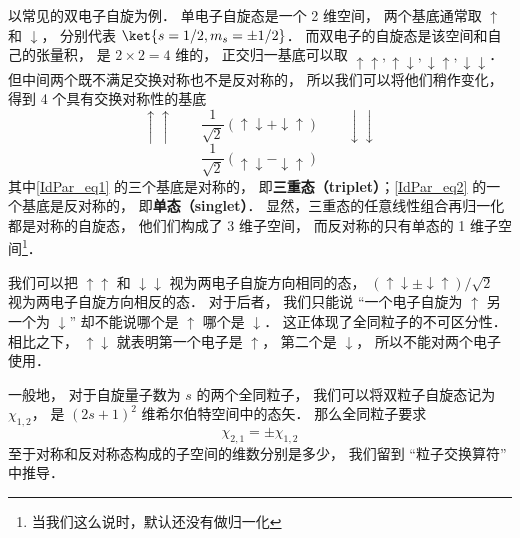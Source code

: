 \begin{example}{}
以常见的双电子自旋为例． 单电子自旋态是一个 2 维空间， 两个基底通常取 $\uparrow$ 和 $\downarrow$， 分别代表 $\ket{s=1/2,m_s=\pm 1/2}$． 而双电子的自旋态是该空间和自己的张量积， 是 $2\times2 = 4$ 维的， 正交归一基底可以取 $\uparrow\uparrow, \uparrow\downarrow, \downarrow\uparrow, \downarrow\downarrow$． 但中间两个既不满足交换对称也不是反对称的， 所以我们可以将他们稍作变化， 得到 4 个具有交换对称性的基底
\begin{equation}\label{IdPar_eq1}
\uparrow\uparrow \qquad \frac{1}{\sqrt 2}(\uparrow\downarrow + \downarrow\uparrow) \qquad \downarrow\downarrow
\end{equation}
\begin{equation}\label{IdPar_eq2}
\frac{1}{\sqrt 2}(\uparrow\downarrow - \downarrow\uparrow)
\end{equation}
其中\autoref{IdPar_eq1} 的三个基底是对称的， 即\textbf{三重态（triplet）}；\autoref{IdPar_eq2} 的一个基底是反对称的， 即\textbf{单态（singlet）}． %
显然，三重态的任意线性组合再归一化都是对称的自旋态， 他们们构成了 3 维子空间， 而反对称的只有单态的 1 维子空间\footnote{当我们这么说时，默认还没有做归一化}．

我们可以把 $\uparrow\uparrow$ 和 $\downarrow\downarrow$ 视为两电子自旋方向相同的态， $(\uparrow\downarrow \pm \downarrow\uparrow)/\sqrt{2}$ 视为两电子自旋方向相反的态． 对于后者， 我们只能说 “一个电子自旋为 $\uparrow$ 另一个为 $\downarrow$” 却不能说哪个是 $\uparrow$ 哪个是 $\downarrow$． 这正体现了全同粒子的不可区分性． 相比之下， $\uparrow\downarrow$ 就表明第一个电子是 $\uparrow$， 第二个是 $\downarrow$， 所以不能对两个电子使用．
\end{example}

一般地， 对于自旋量子数为 $s$ 的两个全同粒子， 我们可以将双粒子自旋态记为 $\chi_{1,2}$， 是 $(2s+1)^2$ 维希尔伯特空间中的态矢． 那么全同粒子要求
\begin{equation}\label{IdPar_eq3}
\chi_{2,1} = \pm\chi_{1,2}
\end{equation}
至于对称和反对称态构成的子空间的维数分别是多少， 我们留到 “粒子交换算符” 中推导．

